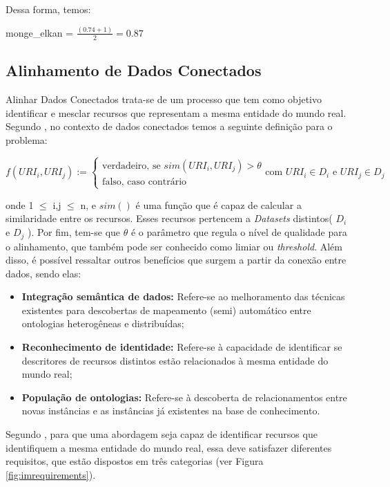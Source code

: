 Dessa forma, temos:

\noindent
monge\_elkan = $\frac{(0.74+1)}{2} = 0.87$

\subsection{Alinhamento de Dados Conectados}

Alinhar Dados Conectados  trata-se de um processo que tem como objetivo identificar e mesclar recursos que representam a mesma entidade do mundo real. Segundo , no contexto de dados conectados temos a seguinte definição para o problema:

\begin{equation}
f\left( { URI }_{ i },{ URI }_{ j } \right) :=\begin{cases} \mbox{verdadeiro, se } sim\left( { URI }_{ i },{ URI }_{ j } \right) >\theta  \\ \mbox{falso, caso contrário} \end{cases}\mbox{com }{ URI }_{ i } \in { D }_{ i }\mbox{ e }{ URI }_{ j } \in { D }_{ j }
\end{equation}

onde 1 $\leq$ i,j $\leq$ n, e $sim()$ é uma função que é capaz de calcular a similaridade entre os recursos. Esses recursos pertencem a \textit{Datasets} distintos( ${ D }_{ i }$ e ${ D }_{ j }$ ). Por fim, tem-se que $\theta$ é o parâmetro que regula o nível de qualidade para o alinhamento, que também pode ser conhecido como limiar ou \textit{threshold}. Além disso, é possível ressaltar outros benefícios que surgem a partir da conexão entre dados, sendo elas: 

\begin{itemize}
	\item \textbf{Integração semântica de dados:} Refere-se ao melhoramento das técnicas existentes para descobertas de mapeamento (semi) automático entre ontologias heterogêneas e distribuídas; 
	\item \textbf{Reconhecimento de identidade:} Refere-se à capacidade de identificar se descritores de recursos distintos estão relacionados à mesma entidade do mundo real; 
	\item\textbf{ População de ontologias:} Refere-se à descoberta de relacionamentos entre novas instâncias e as instâncias já existentes na base de conhecimento. 
\end{itemize}

Segundo , para que uma abordagem seja capaz de identificar recursos que identifiquem a mesma entidade do mundo real, essa deve satisfazer diferentes requisitos, que estão  dispostos em três categorias (ver Figura \ref{fig:imrequirements}).

